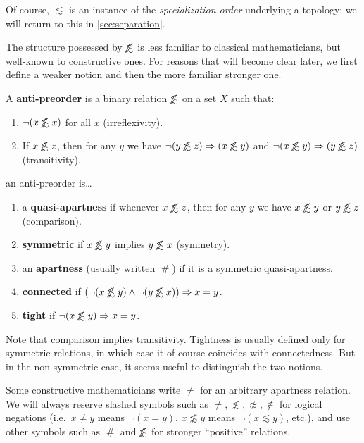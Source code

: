 \documentclass{article}
\def\apart{\mathrel{\#}}
\def\napprox{\not\approx}
\def\oapt{\mathrel{\!\not\,\not\lesssim}}
\def\leapx{\lesssim}
\let\implies\Rightarrow
\begin{document}
Of course, $\leapx$ is an instance of the \emph{specialization order} underlying a topology; we will return to this in \cref{sec:separation}.

The structure possessed by $\oapt$ is less familiar to classical mathematicians, but well-known to constructive ones.  
For reasons that will become clear later, we first define a weaker notion and then the more familiar stronger one.

\begin{defn}\label{def:anti-preorder}
  A \textbf{anti-preorder} is a binary relation $\oapt$ on a set $X$ such that:
  \begin{enumerate}
  \item $\neg(x\oapt x)$ for all $x$ (irreflexivity).
  \item If $x\oapt z$, then for any $y$ we have $\neg(y\oapt z)\implies (x\oapt y)$ and $\neg(x\oapt y)\implies (y\oapt z)$ (transitivity).
  \end{enumerate}
  an anti-preorder is\dots
  \begin{enumerate}[resume]
  \item a \textbf{quasi-apartness} if whenever $x\oapt z$, then for any $y$ we have $x\oapt y$ or $y\oapt z$ (comparison).
  \item \textbf{symmetric} if $x\oapt y$ implies $y\oapt x$ (symmetry).
  \item an \textbf{apartness} (usually written $\apart$) if it is a symmetric quasi-apartness.
  \item \textbf{connected} if $(\neg(x\oapt y)\land \neg(y\oapt x))\implies x=y$.
  \item \textbf{tight} if $\neg(x\oapt y) \implies x=y$.
  \end{enumerate}
\end{defn}

Note that comparison implies transitivity.
Tightness is usually defined only for symmetric relations, in which case it of course coincides with connectedness.
But in the non-symmetric case, it seems useful to distinguish the two notions.

\begin{warn}
  Some constructive mathematicians write $\neq$ for an arbitrary apartness relation.
  We will always reserve slashed symbols such as $\neq,\not\leapx,\napprox,\notin$ for logical negations (i.e.\ $x\neq y$ means $\neg(x=y)$, $x\not\leapx y$ means $\neg(x\leapx y)$, etc.), and use other symbols such as $\apart$ and $\oapt$ for stronger ``positive'' relations.
\end{warn}
\end{document}
